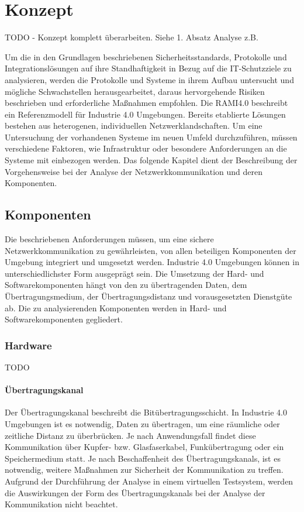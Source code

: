 \chapter{Konzept}
\label{Konzept}
TODO - Konzept komplett überarbeiten. Siehe 1. Absatz Analyse z.B.

Um die in den Grundlagen beschriebenen Sicherheitsstandards, Protokolle und Integrationslösungen auf ihre Standhaftigkeit in Bezug auf die IT-Schutzziele zu analysieren, werden die Protokolle und Systeme in ihrem Aufbau untersucht und mögliche Schwachstellen herausgearbeitet, daraus hervorgehende Risiken beschrieben und erforderliche Maßnahmen empfohlen. Die \ac{RAMI4.0} beschreibt ein Referenzmodell für Industrie 4.0 Umgebungen. Bereits etablierte Lösungen bestehen aus heterogenen, individuellen Netzwerklandschaften. Um eine Untersuchung der vorhandenen Systeme im neuen Umfeld durchzuführen, müssen verschiedene Faktoren, wie Infrastruktur oder besondere Anforderungen an die Systeme mit einbezogen werden. Das folgende Kapitel dient der Beschreibung der Vorgehensweise bei der Analyse der Netzwerkkommunikation und deren Komponenten.

\section{Komponenten}
Die beschriebenen Anforderungen müssen, um eine sichere Netzwerkkommunikation zu gewährleisten, von allen beteiligen Komponenten der Umgebung integriert und umgesetzt werden. Industrie 4.0 Umgebungen können in unterschiedlichster Form ausgeprägt sein. Die Umsetzung der Hard- und Softwarekomponenten hängt von den zu übertragenden Daten, dem Übertragungsmedium, der Übertragungsdistanz und vorausgesetzten Dienstgüte ab. Die zu analysierenden Komponenten werden in Hard- und Softwarekomponenten gegliedert.

\subsection{Hardware}

TODO

\subsubsection{Übertragungskanal}
Der Übertragungskanal beschreibt die Bitübertragungsschicht. In Industrie 4.0 Umgebungen ist es notwendig, Daten zu übertragen, um eine räumliche oder zeitliche Distanz zu überbrücken. Je nach Anwendungsfall findet diese Kommunikation über Kupfer- bzw. Glasfaserkabel, Funkübertragung oder ein Speichermedium statt. Je nach Beschaffenheit des Übertragungskanals, ist es notwendig, weitere Maßnahmen zur Sicherheit der Kommunikation zu treffen. Aufgrund der Durchführung der Analyse in einem virtuellen Testsystem, werden die Auswirkungen der Form des Übertragungskanals bei der Analyse der Kommunikation nicht beachtet.

